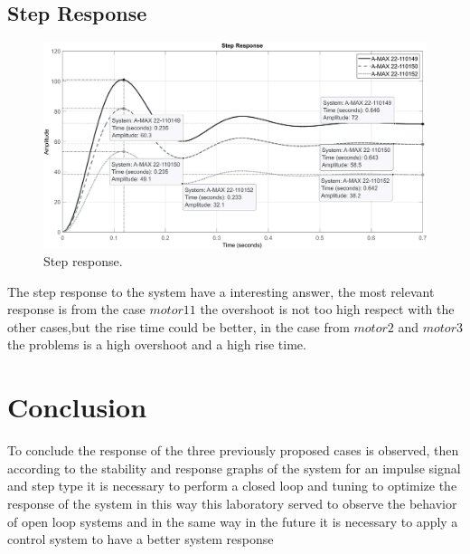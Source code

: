 \documentclass[12pt]{article}
\begin{document}
\subsection{Step Response}
\begin{figure}[H]
	\centering		
	\includegraphics[scale=0.3]{step_Response.eps}
	
	\captionsetup{justification=centering}
	
	\caption{Step response.}
	\label{f3}
\end{figure}
The step response to the system have a interesting answer, the most relevant response is from the case $motor11$ the overshoot is not too high respect with the other cases,but the rise time could be better, in the case from $motor2$ and $motor3$ the problems is a high overshoot and a high rise time. 

\section{Conclusion}
To conclude the response of the three previously proposed cases is observed, then according to the stability and response graphs of the system for an impulse signal and step type it is necessary to perform a closed loop and tuning to optimize the response of the system in this way this laboratory served to observe the behavior of open loop systems and in the same way in the future it is necessary to apply a control system to have a better system response
\end{document}
